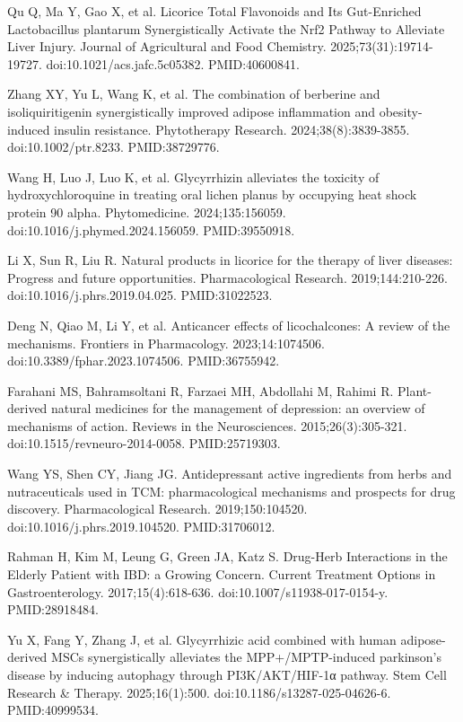 \documentclass[12pt,oneside]{book}
\newcommand{\reff}[2]{\par\hangindent=7mm\hangafter=1\noindent[#1]\hspace{2mm}#2\par}
\begin{document}
\reff{46}{Qu Q, Ma Y, Gao X, et al. Licorice Total Flavonoids and Its Gut-Enriched Lactobacillus plantarum Synergistically Activate the Nrf2 Pathway to Alleviate Liver Injury. Journal of Agricultural and Food Chemistry. 2025;73(31):19714-19727. doi:10.1021/acs.jafc.5c05382. PMID:40600841.}

\reff{47}{Zhang XY, Yu L, Wang K, et al. The combination of berberine and isoliquiritigenin synergistically improved adipose inflammation and obesity-induced insulin resistance. Phytotherapy Research. 2024;38(8):3839-3855. doi:10.1002/ptr.8233. PMID:38729776.}

\reff{48}{Wang H, Luo J, Luo K, et al. Glycyrrhizin alleviates the toxicity of hydroxychloroquine in treating oral lichen planus by occupying heat shock protein 90 alpha. Phytomedicine. 2024;135:156059. doi:10.1016/j.phymed.2024.156059. PMID:39550918.}

\reff{49}{Li X, Sun R, Liu R. Natural products in licorice for the therapy of liver diseases: Progress and future opportunities. Pharmacological Research. 2019;144:210-226. doi:10.1016/j.phrs.2019.04.025. PMID:31022523.}

\reff{50}{Deng N, Qiao M, Li Y, et al. Anticancer effects of licochalcones: A review of the mechanisms. Frontiers in Pharmacology. 2023;14:1074506. doi:10.3389/fphar.2023.1074506. PMID:36755942.}

\reff{51}{Farahani MS, Bahramsoltani R, Farzaei MH, Abdollahi M, Rahimi R. Plant-derived natural medicines for the management of depression: an overview of mechanisms of action. Reviews in the Neurosciences. 2015;26(3):305-321. doi:10.1515/revneuro-2014-0058. PMID:25719303.}

\reff{52}{Wang YS, Shen CY, Jiang JG. Antidepressant active ingredients from herbs and nutraceuticals used in TCM: pharmacological mechanisms and prospects for drug discovery. Pharmacological Research. 2019;150:104520. doi:10.1016/j.phrs.2019.104520. PMID:31706012.}

\reff{53}{Rahman H, Kim M, Leung G, Green JA, Katz S. Drug-Herb Interactions in the Elderly Patient with IBD: a Growing Concern. Current Treatment Options in Gastroenterology. 2017;15(4):618-636. doi:10.1007/s11938-017-0154-y. PMID:28918484.}

\reff{54}{Yu X, Fang Y, Zhang J, et al. Glycyrrhizic acid combined with human adipose-derived MSCs synergistically alleviates the MPP+/MPTP-induced parkinson's disease by inducing autophagy through PI3K/AKT/HIF-1α pathway. Stem Cell Research \& Therapy. 2025;16(1):500. doi:10.1186/s13287-025-04626-6. PMID:40999534.}
\end{document}
